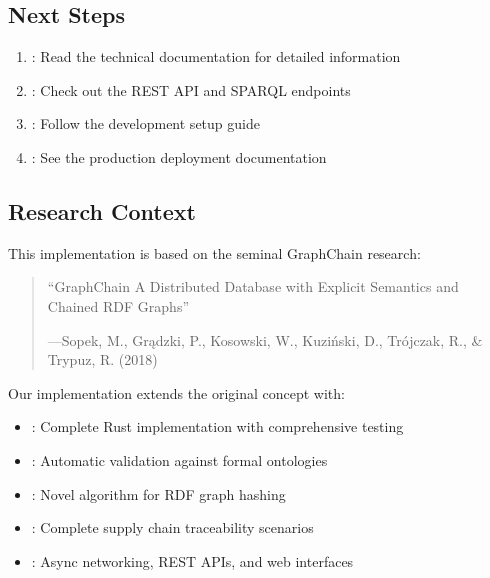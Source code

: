 \documentclass[letterpaper,10pt,english]{sphinxmanual}
\begin{document}
\subsection{Next Steps}
\label{\detokenize{overview/index:next-steps}}\begin{enumerate}
%
\item {} 
\sphinxAtStartPar
{}: Read the technical documentation for detailed information

\item {} 
\sphinxAtStartPar
{}: Check out the REST API and SPARQL endpoints

\item {} 
\sphinxAtStartPar
{}: Follow the development setup guide

\item {} 
\sphinxAtStartPar
{}: See the production deployment documentation

\end{enumerate}


\subsection{Research Context}
\label{\detokenize{overview/index:research-context}}
\sphinxAtStartPar
This implementation is based on the seminal GraphChain research:
\begin{quote}

\sphinxAtStartPar
“GraphChain \textendash{} A Distributed Database with Explicit Semantics and Chained RDF Graphs”

\begin{flushright}
---Sopek, M., Grądzki, P., Kosowski, W., Kuziński, D., Trójczak, R., \& Trypuz, R. (2018)
\end{flushright}
\end{quote}

\sphinxAtStartPar
Our implementation extends the original concept with:
\begin{itemize}
\item {} 
\sphinxAtStartPar
{}: Complete Rust implementation with comprehensive testing

\item {} 
\sphinxAtStartPar
{}: Automatic validation against formal ontologies

\item {} 
\sphinxAtStartPar
{}: Novel algorithm for RDF graph hashing

\item {} 
\sphinxAtStartPar
{}: Complete supply chain traceability scenarios

\item {} 
\sphinxAtStartPar
{}: Async networking, REST APIs, and web interfaces

\end{itemize}
\end{document}
